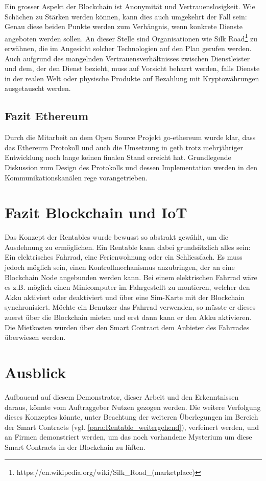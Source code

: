 Ein grosser Aspekt der Blockchain ist Anonymität und Vertrauenslosigkeit. Wie Schächen zu Stärken werden können, kann dies auch umgekehrt der Fall sein: Genau diese beiden Punkte werden zum Verhängnis, wenn konkrete Dienste angeboten werden sollen. An dieser Stelle sind Organisationen wie Silk Road\footnote{https://en.wikipedia.org/wiki/Silk\_Road\_(marketplace)} zu erwähnen, die im Angesicht solcher Technologien auf den Plan gerufen werden. Auch aufgrund des mangelnden Vertrauensverhältnisses zwischen Dienstleister und dem, der den Dienst bezieht, muss auf Vorsicht beharrt werden, falls Dienste in der realen Welt oder physische Produkte auf Bezahlung mit Kryptowährungen ausgetauscht werden.

\subsection{Fazit Ethereum}
Durch die Mitarbeit an dem Open Source Projekt go-ethereum wurde klar, dass das Ethereum Protokoll und auch die Umsetzung in geth trotz mehrjähriger Entwicklung noch lange keinen finalen Stand erreicht hat. Grundlegende Diskussion zum Design des Protokolls und dessen Implementation werden in den Kommunikationskanälen rege vorangetrieben.\cite[Gitter]{go-ethereum}

\section{Fazit Blockchain und IoT}
Das Konzept der Rentables wurde bewusst so abstrakt gewählt, um die Ausdehnung zu ermöglichen. Ein Rentable kann dabei grundsätzlich alles sein: Ein elektrisches Fahrrad, eine Ferienwohnung oder ein Schliessfach. Es muss jedoch möglich sein, einen Kontrollmechanismus anzubringen, der an eine Blockchain Node angebunden werden kann. Bei einem elektrischen Fahrrad wäre es z.B. möglich einen Minicomputer im Fahrgestellt zu montieren, welcher den Akku aktiviert oder deaktiviert und über eine Sim-Karte mit der Blockchain synchronisiert. Möchte ein Benutzer das Fahrrad verwenden, so müsste er dieses zuerst über die Blockchain mieten und erst dann kann er den Akku aktivieren. Die Mietkosten würden über den Smart Contract dem Anbieter des Fahrrades überwiesen werden.

\section{Ausblick}
Aufbauend auf diesem Demonstrator, dieser Arbeit und den Erkenntnissen daraus, könnte vom Auftraggeber Nutzen gezogen werden. Die weitere Verfolgung dieses Konzeptes könnte, unter Beachtung der weiteren Überlegungen im Bereich der Smart Contracts (vgl. \ref{para:Rentable_weitergehend}), verfeinert werden, und an Firmen demonstriert werden, um das noch vorhandene Mysterium um diese Smart Contracts in der Blockchain zu lüften.

